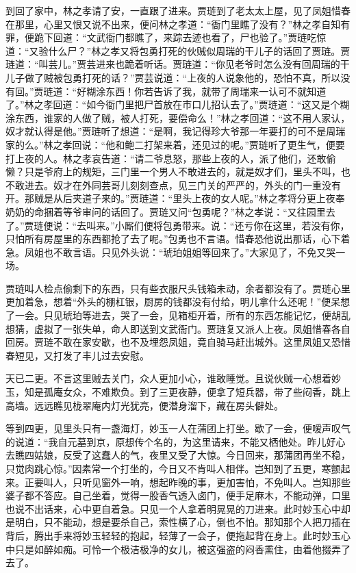 \begin{parag}
    到回了家中，林之孝请了安，一直跟了进来。贾琏到了老太太上屋，见了凤姐惜春在那里，心里又恨又说不出来，便问林之孝道：“衙门里瞧了没有？”林之孝自知有罪，便跪下回道：“文武衙门都瞧了，来踪去迹也看了，尸也验了。”贾琏吃惊道：“又验什么尸？”林之孝又将包勇打死的伙贼似周瑞的干儿子的话回了贾琏。贾琏道：“叫芸儿。”贾芸进来也跪着听话。贾琏道：“你见老爷时怎么没有回周瑞的干儿子做了贼被包勇打死的话？”贾芸说道：“上夜的人说象他的，恐怕不真，所以没有回。”贾琏道：“好糊涂东西！你若告诉了我，就带了周瑞来一认可不就知道了。”林之孝回道：“如今衙门里把尸首放在市口儿招认去了。”贾琏道：“这又是个糊涂东西，谁家的人做了贼，被人打死，要偿命么！”林之孝回道：“这不用人家认，奴才就认得是他。”贾琏听了想道：“是啊，我记得珍大爷那一年要打的可不是周瑞家的么。”林之孝回说：“他和鲍二打架来着，还见过的呢。”贾琏听了更生气，便要打上夜的人。林之孝哀告道：“请二爷息怒，那些上夜的人，派了他们，还敢偷懒？只是爷府上的规矩，三门里一个男人不敢进去的，就是奴才们，里头不叫，也不敢进去。奴才在外同芸哥儿刻刻查点，见三门关的严严的，外头的门一重没有开。那贼是从后夹道子来的。”贾琏道：“里头上夜的女人呢。”林之孝将分更上夜奉奶奶的命捆着等爷审问的话回了。贾琏又问“包勇呢？”林之孝说：“又往园里去了。”贾琏便说：“去叫来。”小厮们便将包勇带来。说：“还亏你在这里，若没有你，只怕所有房屋里的东西都抢了去了呢。”包勇也不言语。惜春恐他说出那话，心下着急。凤姐也不敢言语。只见外头说：“琥珀姐姐等回来了。”大家见了，不免又哭一场。
\end{parag}


\begin{parag}
    贾琏叫人检点偷剩下的东西，只有些衣服尺头钱箱未动，余者都没有了。贾琏心里更加着急，想着“外头的棚杠银，厨房的钱都没有付给，明儿拿什么还呢！”便呆想了一会。只见琥珀等进去，哭了一会，见箱柜开着，所有的东西怎能记忆，便胡乱想猜，虚拟了一张失单，命人即送到文武衙门。贾琏复又派人上夜。凤姐惜春各自回房。贾琏不敢在家安歇，也不及埋怨凤姐，竟自骑马赶出城外。这里凤姐又恐惜春短见，又打发了丰儿过去安慰。
\end{parag}


\begin{parag}
    天已二更。不言这里贼去关门，众人更加小心，谁敢睡觉。且说伙贼一心想着妙玉，知是孤庵女众，不难欺负。到了三更夜静，便拿了短兵器，带了些闷香，跳上高墙。远远瞧见栊翠庵内灯光犹亮，便潜身溜下，藏在房头僻处。
\end{parag}


\begin{parag}
    等到四更，见里头只有一盏海灯，妙玉一人在蒲团上打坐。歇了一会，便嗳声叹气的说道：“我自元墓到京，原想传个名的，为这里请来，不能又栖他处。昨儿好心去瞧四姑娘，反受了这蠢人的气，夜里又受了大惊。今日回来，那蒲团再坐不稳，只觉肉跳心惊。”因素常一个打坐的，今日又不肯叫人相伴。岂知到了五更，寒颤起来。正要叫人，只听见窗外一响，想起昨晚的事，更加害怕，不免叫人。岂知那些婆子都不答应。自己坐着，觉得一股香气透入卤门，便手足麻木，不能动弹，口里也说不出话来，心中更自着急。只见一个人拿着明晃晃的刀进来。此时妙玉心中却是明白，只不能动，想是要杀自己，索性横了心，倒也不怕。那知那个人把刀插在背后，腾出手来将妙玉轻轻的抱起，轻薄了一会子，便拖起背在身上。此时妙玉心中只是如醉如痴。可怜一个极洁极净的女儿，被这强盗的闷香熏住，由着他掇弄了去了。
\end{parag}


